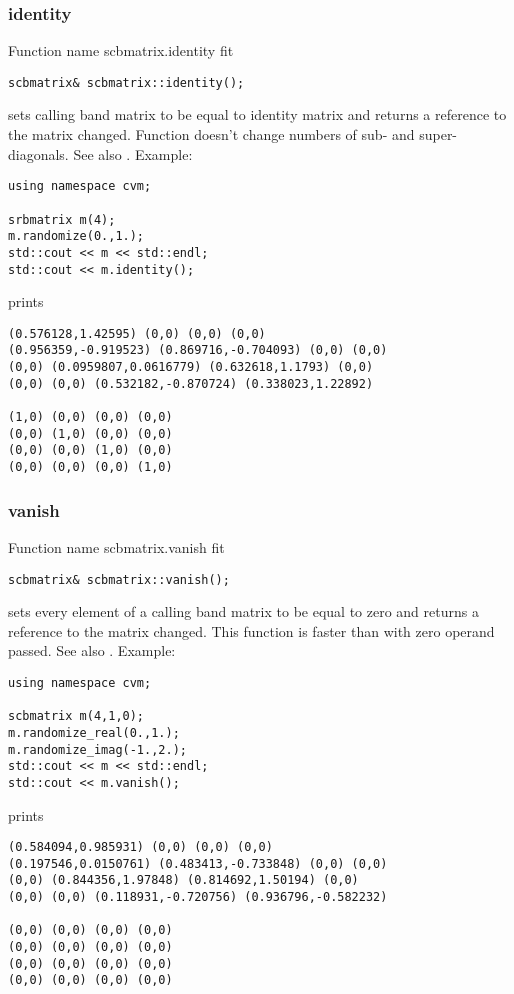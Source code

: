 \subsubsection{identity}
Function%
\pdfdest name {scbmatrix.identity} fit
\begin{verbatim}
scbmatrix& scbmatrix::identity();
\end{verbatim}
sets  calling band matrix to be equal to identity matrix
and returns a reference to
the matrix changed. Function doesn't change
numbers of sub- and super-diagonals.
See also .
Example:
\begin{Verbatim}
using namespace cvm;

srbmatrix m(4);
m.randomize(0.,1.);
std::cout << m << std::endl;
std::cout << m.identity();
\end{Verbatim}
prints
\begin{Verbatim}
(0.576128,1.42595) (0,0) (0,0) (0,0)
(0.956359,-0.919523) (0.869716,-0.704093) (0,0) (0,0)
(0,0) (0.0959807,0.0616779) (0.632618,1.1793) (0,0)
(0,0) (0,0) (0.532182,-0.870724) (0.338023,1.22892)

(1,0) (0,0) (0,0) (0,0)
(0,0) (1,0) (0,0) (0,0)
(0,0) (0,0) (1,0) (0,0)
(0,0) (0,0) (0,0) (1,0)
\end{Verbatim}
\newpage





\subsubsection{vanish}
Function%
\pdfdest name {scbmatrix.vanish} fit
\begin{verbatim}
scbmatrix& scbmatrix::vanish();
\end{verbatim}
sets every element of a calling band matrix to be equal to zero
and returns a reference to
the matrix changed. This function is faster
than
with zero operand passed.
See also .
Example:
\begin{Verbatim}
using namespace cvm;

scbmatrix m(4,1,0);
m.randomize_real(0.,1.);
m.randomize_imag(-1.,2.);
std::cout << m << std::endl;
std::cout << m.vanish();
\end{Verbatim}
prints
\begin{Verbatim}
(0.584094,0.985931) (0,0) (0,0) (0,0)
(0.197546,0.0150761) (0.483413,-0.733848) (0,0) (0,0)
(0,0) (0.844356,1.97848) (0.814692,1.50194) (0,0)
(0,0) (0,0) (0.118931,-0.720756) (0.936796,-0.582232)

(0,0) (0,0) (0,0) (0,0)
(0,0) (0,0) (0,0) (0,0)
(0,0) (0,0) (0,0) (0,0)
(0,0) (0,0) (0,0) (0,0)
\end{Verbatim}
\newpage


